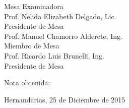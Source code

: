 

\vspace*{5\baselineskip}



\vspace*{5\baselineskip}
\hspace{.1\textwidth} %
\begin{minipage}{.8\textwidth}
		
\end{minipage}

\vspace*{2\baselineskip}
\begin{center}
	Mesa Examinadora\\
	\vspace*{2\baselineskip}
	Prof. Nelida Elizabeth Delgado, Lic.\\
	Presidente de Mesa\\
	\vspace*{2\baselineskip}
	Prof. Manuel Chamorro Alderete, Ing.\\	
	Miembro de Mesa\\
	\vspace*{2\baselineskip}
	Prof. Ricardo Luis Brunelli, Ing.\\
	Presidente de Mesa\\
\end{center}
\vspace*{4\baselineskip}
Nota obtenida:

\vspace*{1\baselineskip}
\hspace{.5\textwidth} %
Hernandarias, 25 de Diciembre de 2015

